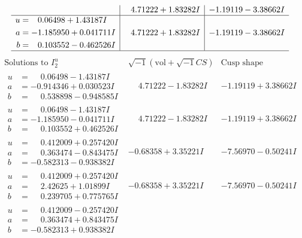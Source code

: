 \documentclass[1p]{elsarticle_modified}
\theoremstyle{definition}
\newcommand{\I}{\sqrt{-1}}
\begin{document}
$$\begin{array}{c|c|c}
 & \phantom{-}4.71222 + 1.83282 I & -1.19119 - 3.38662 I \\ \hline\begin{aligned}
u &= \phantom{-}0.06498 + 1.43187 I \\
a &= -1.185950 + 0.041711 I \\
b &= \phantom{-}0.103552 - 0.462526 I\end{aligned}
 & \phantom{-}4.71222 + 1.83282 I & -1.19119 - 3.38662 I\\
 \hline 
 \end{array}$$\newpage$$\begin{array}{c|c|c}  
\text{Solutions to }I^u_{2}& \I (\text{vol} + \sqrt{-1}CS) & \text{Cusp shape}\\
 \hline 
\begin{aligned}
u &= \phantom{-}0.06498 - 1.43187 I \\
a &= -0.914346 + 0.030523 I \\
b &= \phantom{-}0.538898 - 0.948585 I\end{aligned}
 & \phantom{-}4.71222 - 1.83282 I & -1.19119 + 3.38662 I \\ \hline\begin{aligned}
u &= \phantom{-}0.06498 - 1.43187 I \\
a &= -1.185950 - 0.041711 I \\
b &= \phantom{-}0.103552 + 0.462526 I\end{aligned}
 & \phantom{-}4.71222 - 1.83282 I & -1.19119 + 3.38662 I \\ \hline\begin{aligned}
u &= \phantom{-}0.412009 + 0.257420 I \\
a &= \phantom{-}0.363474 - 0.843475 I \\
b &= -0.582313 - 0.938382 I\end{aligned}
 & -0.68358 + 3.35221 I & -7.56970 - 0.50241 I \\ \hline\begin{aligned}
u &= \phantom{-}0.412009 + 0.257420 I \\
a &= \phantom{-}2.42625 + 1.01899 I \\
b &= \phantom{-}0.239705 + 0.775765 I\end{aligned}
 & -0.68358 + 3.35221 I & -7.56970 - 0.50241 I \\ \hline\begin{aligned}
u &= \phantom{-}0.412009 - 0.257420 I \\
a &= \phantom{-}0.363474 + 0.843475 I \\
b &= -0.582313 + 0.938382 I\end{aligned}

\end{array}$$
\end{document}
